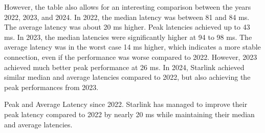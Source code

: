 However, the table also allows for an interesting comparison between the years
2022, 2023, and 2024. In 2022, the median latency was between 81 and 84 ms. The
average latency was about 20 ms higher. Peak latencies achieved up to 43 ms. In
2023, the median latencies were significantly higher at 94 to 98 ms. The
average latency was in the worst case 14 ms higher, which indicates a more
stable connection, even if the performance was worse compared to 2022. However,
2023 achieved much better peak performance at 26 ms. In 2024, Starlink achieved
similar median and average latencies compared to 2022, but also achieving the
peak performances from 2023.

\begin{takeaway}{Peak and Average Latency since 2022.}
	Starlink has managed to improve their peak latency compared to 2022 by
	nearly 20 ms while maintaining their median and average latencies.
\end{takeaway}

